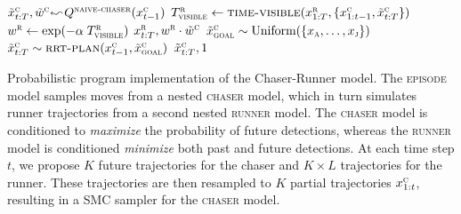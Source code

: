 \documentclass[twoside]{article}
\newcommand{\qry}{\ensuremath{$\reflectbox{$\,\leadsto$}$}}
\begin{document}
\begin{algorithm}[!t]
\begin{algorithmic}
    \State $\tilde{x}^\textsc{c}_{t:T}, \tilde{w}^\textsc{c} \qry Q^\textsc{naive-chaser}(x^\textsc{c}_{t-1})$
    \State $T^\textsc{r}_\textsc{visible} \gets \Call{time-visible}{x^\textsc{r}_{1:T}, \{x^\textsc{c}_{1:t-1}, \tilde{x}^\textsc{c}_{t:T}\}}$
    \State $w^\textsc{r} \gets \exp(-\alpha \; T^\textsc{r}_\textsc{visible})$
    \State \Return $x^\textsc{r}_{t:T},  w^\textsc{r} \cdot \tilde{w}^\textsc{c}$
\EndQuery
{} 
    \State $\tilde{x}^\textsc{c}_\textsc{goal} \sim \text{Uniform}(\{x_\textsc{a},\ldots,x_\textsc{j}\})$
    \State $\tilde{x}^\textsc{c}_{t:T} \sim \Call{rrt-plan}{x^\textsc{c}_{t-1}, \tilde{x}^\textsc{c}_\textsc{goal}}$ 
    \State \Return $\tilde{x}^\textsc{c}_{t:T}, 1$
\EndQuery
\end{algorithmic}

\caption{
\label{alg:chaser-runner-programs}
Probabilistic program implementation of the Chaser-Runner model. The \textsc{episode} model samples moves from a nested \textsc{chaser} model, which in turn simulates runner trajectories from a second nested \textsc{runner} model. The \textsc{chaser} model is conditioned to \emph{maximize} the probability of future detections, whereas the \textsc{runner} model is conditioned \emph{minimize} both past and future detections. At each time step $t$, we propose $K$ future trajectories for the chaser and $K \times L$ trajectories for the runner. These trajectories are then resampled to $K$ partial trajectories $x^\textsc{c}_{1:t}$, resulting in a SMC sampler for the \textsc{chaser} model.}
\end{algorithm}
\end{document}
